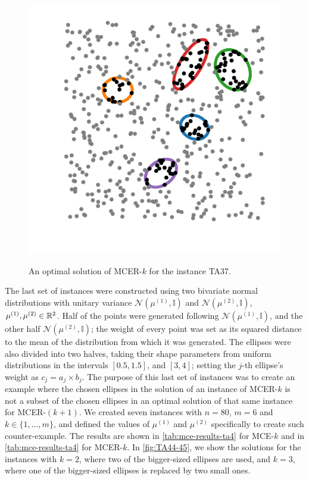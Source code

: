 \begin{figure}[!htb]
	\centering
	\caption{An optimal solution of MCER-$k$ for the instance TA37.}
	\includegraphics[scale=.8]{tex/figures/TA037}
	\fautor
	\label{fig:TA037}
\end{figure}

The last set of instances were constructed using two bivariate normal distributions with unitary variance $\mathcal{N}(\mu^{(1)}, \mathbb{I})$ and $\mathcal{N}(\mu^{(2)}, \mathbb{I})$, $\mu^{(1)}, \mu^{(2)} \in \mathbb{R}^2$. Half of the points were generated following $\mathcal{N}(\mu^{(1)}, \mathbb{I})$, and the other half $\mathcal{N}(\mu^{(2)}, \mathbb{I})$; the weight of every point was set as its squared distance to the mean of the distribution from which it was generated.
The ellipses were also divided into two halves, taking their shape parameters from uniform distributions in the intervals $[0.5, 1.5]$, and $[3, 4]$; setting the $j$-th ellipse's weight as $c_j=a_j \times b_j$.
The purpose of this last set of instances was to create an example where the chosen ellipses in the solution of an instance of MCER-$k$ is not a subset of the chosen ellipses in an optimal solution of that same instance for MCER-$(k+1)$. We created seven instances with $n=80$, $m=6$ and $k\in\{1, \dots, m\}$, and defined the values of $\mu^{(1)}$ and $\mu^{(2)}$ specifically to create such counter-example. The results are shown in \autoref{tab:mce-results-ta4} for MCE-$k$ and in \autoref{tab:mce-results-ta4} for MCER-$k$.
In \autoref{fig:TA44-45}, we show the solutions for the instances with $k=2$, where two of the bigger-sized ellipses are used, and $k=3$, where one of the bigger-sized ellipses is replaced by two small ones.

